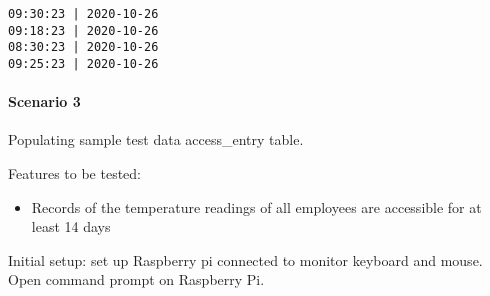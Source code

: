 \begin{listing}[H]
\begin{verbatim}
09:30:23 | 2020-10-26
09:18:23 | 2020-10-26
08:30:23 | 2020-10-26
09:25:23 | 2020-10-26
\end{verbatim}
\end{listing}

\paragraph{Scenario 3}
Populating sample test data access\_entry table.

\noindent
Features to be tested:
\begin{itemize}
    \item Records of the temperature readings of all employees are accessible
          for at least 14 days
\end{itemize}

\noindent
Initial setup: set up Raspberry pi connected to monitor keyboard and mouse.
Open command prompt on Raspberry Pi.

